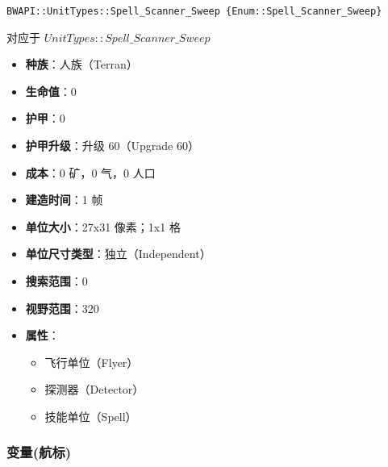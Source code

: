 \begin{tcolorbox}[colback=white, colframe=black!60!white, title=Spell\_Scanner\_Sweep(), arc=0mm]
    \begin{verbatim}
BWAPI::UnitTypes::Spell_Scanner_Sweep {Enum::Spell_Scanner_Sweep}
    \end{verbatim}
    对应于  $UnitTypes::Spell\_Scanner\_Sweep$ 
    \begin{itemize}
        \item \textbf{种族}：人族（Terran）
        \item \textbf{生命值}：0
        \item \textbf{护甲}：0
        \item \textbf{护甲升级}：升级 60（Upgrade 60）
        \item \textbf{成本}：0 矿，0 气，0 人口
        \item \textbf{建造时间}：1 帧
        \item \textbf{单位大小}：27x31 像素；1x1 格
        \item \textbf{单位尺寸类型}：独立（Independent）
        \item \textbf{搜索范围}：0
        \item \textbf{视野范围}：320
        \item \textbf{属性}：
            \begin{itemize}
                \item 飞行单位（Flyer）
                \item 探测器（Detector）
                \item 技能单位（Spell）
            \end{itemize}
    \end{itemize}
\end{tcolorbox}

\subsubsection{变量(航标)}

